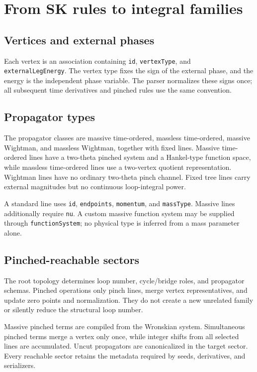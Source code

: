 ﻿\documentclass[a4paper,11pt]{article}
\begin{document}
\section{From SK rules to integral families}

\subsection{Vertices and external phases}

Each vertex is an association containing \texttt{id}, \texttt{vertexType}, and
\texttt{externalLegEnergy}. The vertex type fixes the sign of the external phase, and the
energy is the independent phase variable. The parser normalizes these signs once; all
subsequent time derivatives and pinched rules use the same convention.

\subsection{Propagator types}

The propagator classes are massive time-ordered, massless time-ordered, massive Wightman,
and massless Wightman, together with fixed lines. Massive time-ordered lines have a
two-theta pinched system and a Hankel-type function space, while massless time-ordered
lines use a two-vertex quotient representation. Wightman lines have no ordinary two-theta
pinch channel. Fixed tree lines carry external magnitudes but no continuous loop-integral
power.

A standard line uses \texttt{id}, \texttt{endpoints}, \texttt{momentum}, and
\texttt{massType}. Massive lines additionally require \texttt{nu}. A custom massive
function system may be supplied through \texttt{functionSystem}; no physical type is
inferred from a mass parameter alone.

\subsection{Pinched-reachable sectors}

The root topology determines loop number, cycle/bridge roles, and propagator schemas.
Pinched operations only pinch lines, merge vertex representatives, and update zero points
and normalization. They do not create a new unrelated family or silently reduce the
structural loop number.

Massive pinched terms are compiled from the Wronskian system. Simultaneous pinched terms merge
a vertex only once, while integer shifts from all selected lines are accumulated. Uncut
propagators are canonicalized in the target sector. Every reachable sector retains the
metadata required by seeds, derivatives, and serializers.
\end{document}

